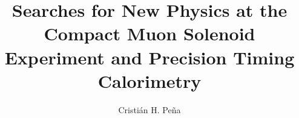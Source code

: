 \documentclass[14pt]{caltech_thesis}
\begin{document}
\title{Searches for New Physics at the Compact
Muon Solenoid Experiment and Precision Timing Calorimetry}
\author{Cristi\'an H. Pe\~na}

\address{Pasadena, California}                     %




\maketitle[logo]
\end{document}
